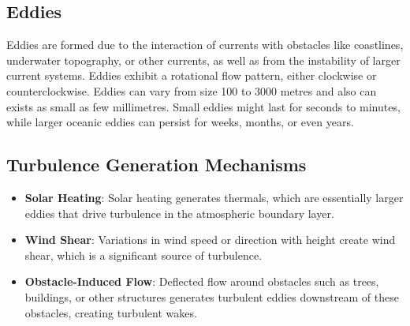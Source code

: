 \documentclass[fleqn,10pt]{SelfArx} %
\begin{document}
\subsection{Eddies}
Eddies are formed due to the interaction of currents with obstacles like coastlines, underwater topography, or other currents, as well as from the instability of larger current systems.
Eddies exhibit a rotational flow pattern, either clockwise or counterclockwise.
Eddies can vary from size 100 to 3000 metres and also can exists as small as few millimetres.
Small eddies might last for seconds to minutes, while larger oceanic eddies can persist for weeks, months, or even years.

\subsection{Turbulence Generation Mechanisms}
\begin{itemize} [noitemsep]
	\item \textbf{Solar Heating}: Solar heating generates thermals, which are essentially larger eddies that drive turbulence in the atmospheric boundary layer.
	\item \textbf{Wind Shear}: Variations in wind speed or direction with height create wind shear, which is a significant source of turbulence.
	\item \textbf{Obstacle-Induced Flow}: Deflected flow around obstacles such as trees, buildings, or other structures generates turbulent eddies downstream of these obstacles, creating turbulent wakes.
\end{itemize}

\end{document}
